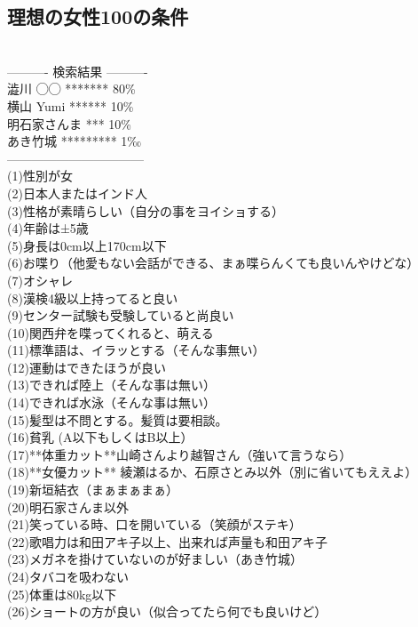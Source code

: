 \documentclass[12pt]{jsarticle}
\begin{document}
\subsection{理想の女性100の条件}
　\\
---------- 検索結果 ---------- \\
    澁川 ◯◯ *******  80\%\\
    横山 Yumi ******  10\%\\
    明石家さんま *** 10\%\\
    あき竹城 *********  1‰\\
---------------------------------\\
(1)性別が女\\
(2)日本人またはインド人\\
(3)性格が素晴らしい（自分の事をヨイショする）\\
(4)年齢は±5歳\\
(5)身長は0cm以上170cm以下\\
(6)お喋り（他愛もない会話ができる、まぁ喋らんくても良いんやけどな）\\
(7)オシャレ\\
(8)漢検4級以上持ってると良い\\
(9)センター試験も受験していると尚良い\\
(10)関西弁を喋ってくれると、萌える\\
(11)標準語は、イラッとする（そんな事無い）\\
(12)運動はできたほうが良い\\
(13)できれば陸上（そんな事は無い）\\
(14)できれば水泳（そんな事は無い）\\
(15)髪型は不問とする。髪質は要相談。\\
(16)貧乳  (A以下もしくはB以上）\\
(17)**体重カット**山崎さんより越智さん（強いて言うなら）\\
(18)**女優カット** 綾瀬はるか、石原さとみ以外（別に省いてもええよ）\\
(19)新垣結衣（まぁまぁまぁ）\\
(20)明石家さんま以外\\
(21)笑っている時、口を開いている（笑顔がステキ）\\
(22)歌唱力は和田アキ子以上、出来れば声量も和田アキ子\\
(23)メガネを掛けていないのが好ましい（あき竹城）\\
(24)タバコを吸わない\\
(25)体重は80kg以下\\
(26)ショートの方が良い（似合ってたら何でも良いけど）\\
\end{document}
